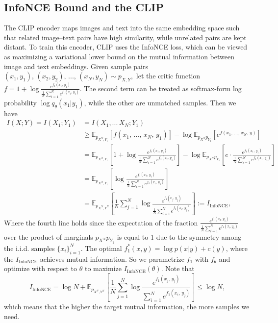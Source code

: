 \subsection{InfoNCE Bound and the CLIP}
The CLIP encoder maps images and text into the same embedding space such that related image–text pairs have high similarity, while unrelated pairs are kept distant. To train this encoder, CLIP uses the InfoNCE loss, which can be viewed as maximizing a variational lower bound on the mutual information between image and text embeddings.
Given sample pairs $(x_1,y_1),\,(x_2,y_2),\,...,\,(x_N,y_N)\sim p_{X,Y},$ let the critic function $f=1+\log\frac{e^{f_1(x_1,\,y_1)}}{\frac{1}{N}\sum_{i=1}^Ne^{f_1(x_i,\,y_1)}}$. The second term can be treated as softmax-form log probability $\log q_{\theta}(x_1|y_1)$, while the other are unmatched samples. Then we have
\[
\begin{aligned}
I(X;Y)=I(X_1;Y_1)&=I(X_1,...\,X_N;Y_1)\\&\geq\mathbb{E}_{p_{X^N,Y_1}}[f(x_1,\,...,\,x_N,\,y_1)]-\log\mathbb{E}_{p_{X^N}p_{Y_1}}[e^{f(x_1,\,...,\,x_N,\,y)}]\\&=\mathbb{E}_{p_{X^N,Y_1}}\left[1+\log\frac{e^{f_1(x_1,\,y_1)}}{\frac{1}{N}\sum_{i=1}^Ne^{f_1(x_i,\,y_1)}}\right]-\log\mathbb{E}_{p_{X^N}p_{Y_1}}\left[e\cdot\frac{e^{f_1(x_1,\,y_1)}}{\frac{1}{N}\sum_{i=1}^Ne^{f_1(x_i,\,y_1)}}\right]\\&=\mathbb{E}_{p_{X^N,Y_1}}\left[\log\frac{e^{f_1(x_1,\,y_1)}}{\frac{1}{N}\sum_{i=1}^Ne^{f_1(x_i,\,y_1)}}\right]\\&=\mathbb{E}_{p_{X^N,Y^N}}\left[\frac{1}{N}\sum_{j=1}^N\log\frac{e^{f_1(x_j,\,y_j)}}{\frac{1}{N}\sum_{i=1}^Ne^{f_1(x_i,\,y_j)}}\right]:=I_{\text{InfoNCE}},
\end{aligned}
\]
Where the fourth line holds since the expectation of the fraction $\frac{e^{f_1(x_k,y_1)}}{\frac{1}{N}\sum_{i=1}^N e^{f_1(x_i,y_1)}}$ over the product of marginals $p_{X^N}p_{Y_1}$ is equal to 1 due to the symmetry among the i.i.d. samples $\{x_i\}_{i=1}^N$.
The optimal $f_1^*(x,y) = \log p(x|y) + c(y)$, where the $I_{\text{InfoNCE}}$ achieves mutual information. So we parametrize $f_1$ with $f_{\theta}$ and optimize with respect to $\theta$ to  maximize $I_{\text{InfoNCE}}(\theta)$. Note that 
\[I_{\text{InfoNCE}}=\log N+\mathbb{E}_{p_{X^N,Y^N}}\left[\frac{1}{N}\sum_{j=1}^N\log\frac{e^{f_1(x_j,\,y_j)}}{\sum_{i=1}^Ne^{f_1(x_i,\,y_j)}}\right]\leq \log N,\] 
which means that the higher the target mutual information, the more samples we need.\\\\
